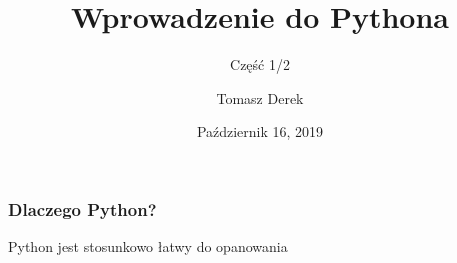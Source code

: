 \documentclass[17pt]{beamer}
\title{Wprowadzenie do Pythona}
\subtitle{Część 1/2}
\author{Tomasz Derek}
\institute{KMS}
\date{Październik 16, 2019}
\begin{document}
 
\frame{\titlepage}
 
\begin{frame}
\frametitle{Dlaczego Python?}
Python jest stosunkowo łatwy do opanowania
\end{frame}
\end{document}
